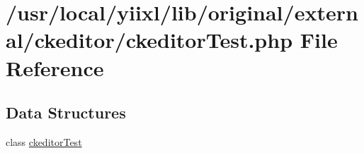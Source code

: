 \hypertarget{ckeditorTest_8php}{
\section{/usr/local/yiixl/lib/original/external/ckeditor/ckeditorTest.php File Reference}
\label{ckeditorTest_8php}
}
\subsection*{Data Structures}
\begin{DoxyCompactItemize}
\item 
class \hyperlink{classckeditorTest}{ckeditorTest}
\end{DoxyCompactItemize}
